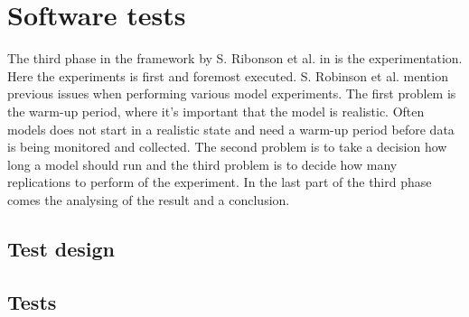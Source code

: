 \section{Software tests}\label{sec:methodSoftwareTests}
The third phase in the framework by S. Ribonson et al. in \cite{SecretsSuccessfulSimulation1995} is the experimentation.
Here the experiments is first and foremost executed.
S. Robinson et al. mention previous issues when performing various model experiments.
The first problem is the warm-up period, where it's important that the model is realistic.
Often models does not start in a realistic state and need a warm-up period before data is being monitored and collected.
The second problem is to take a decision how long a model should run and the third problem is to decide how many replications to perform of the experiment.
In the last part of the third phase comes the analysing of the result and a conclusion.

\subsection{Test design}\label{sec:methodTestDesign}
\subsection{Tests}\label{sec:methodTests}



